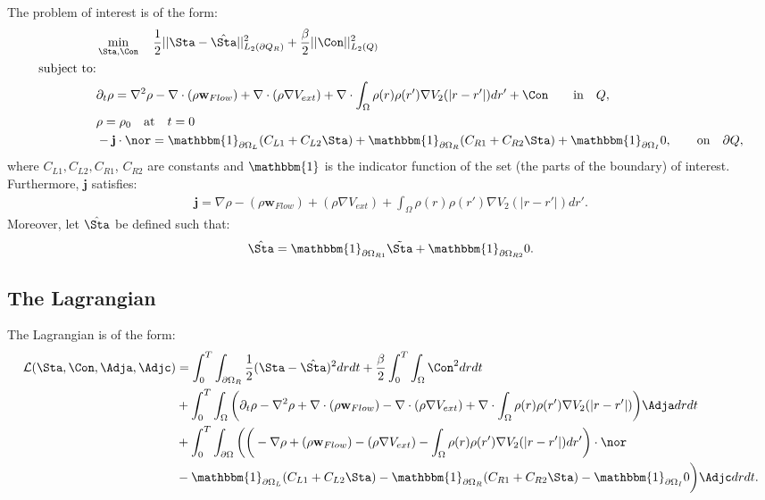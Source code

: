 

The problem of interest is of the form:
\begin{align*}
&\min_{\Sta, \Con} \quad \frac{1}{2}|| \Sta -\hat \Sta||^2_{L_2(\partial Q_R)} + \frac{\beta}{2}|| \Con||^2_{L_2(Q)}\\
\text{subject to:}\\
&\partial_t \rho = \nabla^2 \rho - \nabla \cdot (\rho \mathbf{w}_{Flow}) +\nabla \cdot (\rho \nabla V_{ext}) + \nabla \cdot \int_\Omega \rho(r) \rho(r') \nabla V_2(|r-r'|) dr' + \Con \quad  \quad\text{in} \quad Q,\notag\\
& \rho = \rho_0 \quad \text{at} \quad t=0 \notag\\
& - \mathbf{j} \cdot \nor = \mathbbm{1}_{\partial \Omega_L}( C_{L1}  + C_{L2}\Sta) +\mathbbm{1}_{\partial \Omega_R} ( C_{R1}  + C_{R2}\Sta) +\mathbbm{1}_{\partial \Omega_I} 0, \quad  \quad\text{on} \quad \partial Q, 
\end{align*}
where $C_{L1}, C_{L2}, C_{R1}$, $C_{R2}$ are constants and $\mathbbm{1}$ is the indicator function of the set (the parts of the boundary) of interest.
Furthermore, $\mathbf{j}$ satisfies:
\begin{align*}
\mathbf{j}=\nabla \rho - (\rho \mathbf{w}_{Flow}) +(\rho \nabla V_{ext}) +  \int_\Omega \rho(r) \rho(r') \nabla V_2(|r-r'|) dr'.
\end{align*}
Moreover, let $\hat \Sta$ be defined such that:
\begin{align*}
\hat \Sta = \mathbbm{1}_{\partial \Omega_{R1}} \tilde \Sta  +\mathbbm{1}_{\partial \Omega_{R2}} 0.
\end{align*}

\subsection*{The Lagrangian}
The Lagrangian is of the form:
\begin{align*}
\mathcal{L}(\Sta,\Con,\Adja,\Adjc ) &= \int_0^T \int_{\partial \Omega_R} \frac{1}{2}(\Sta - \hat \Sta)^2 dr dt + \frac{\beta}{2}\int_0^T \int_\Omega \Con^2 drdt \\
&+ \int_0^T \int_\Omega \bigg( \partial_t \rho - \nabla^2 \rho + \nabla \cdot (\rho \mathbf{w}_{Flow}) -\nabla \cdot (\rho \nabla V_{ext}) + \nabla \cdot \int_\Omega \rho(r) \rho(r') \nabla V_2(|r-r'|) \bigg) \Adja dr dt\\
&+ \int_0^T \int_{\partial \Omega} \bigg(  \bigg(-\nabla \rho+ (\rho \mathbf{w}_{Flow}) -(\rho \nabla V_{ext}) -  \int_\Omega \rho(r) \rho(r') \nabla V_2(|r-r'|) dr' \bigg)\cdot \nor\\
&  -\mathbbm{1}_{\partial \Omega_L}( C_{L1}  + C_{L2}\Sta) -\mathbbm{1}_{\partial \Omega_R} ( C_{R1}  + C_{R2}\Sta) -\mathbbm{1}_{\partial \Omega_I} 0 \bigg) \Adjc dr dt.
\end{align*}

